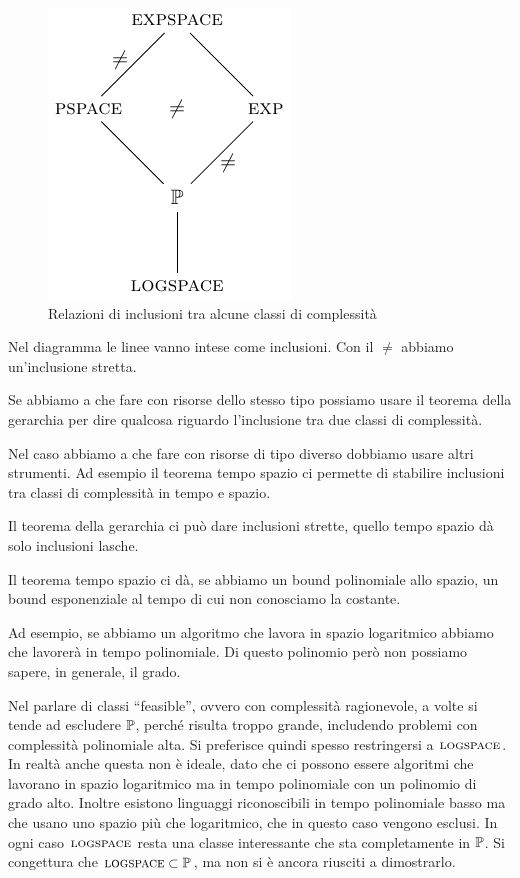 \begin{figure}[!h]
    \begin{center}
        \includegraphics{./img/timespacehierarchies/ComplexityDiagram.pdf}
        \caption{Relazioni di inclusioni tra alcune classi di complessità}
        \label{timespacehierarchies:img:detclassesrelations}
    \end{center}
\end{figure}

Nel diagramma le linee vanno intese come inclusioni. Con il $\not=$ abbiamo un'inclusione stretta.

Se abbiamo a che fare con risorse dello stesso tipo possiamo usare il teorema della gerarchia per
dire qualcosa riguardo l'inclusione tra due classi di complessità.

Nel caso abbiamo a che fare con risorse di tipo diverso dobbiamo usare altri strumenti. Ad esempio
il teorema tempo spazio ci permette di stabilire inclusioni tra classi di complessità in tempo e
spazio.

Il teorema della gerarchia ci può dare inclusioni strette, quello tempo spazio dà solo inclusioni
lasche.

Il teorema tempo spazio ci dà, se abbiamo un bound polinomiale allo spazio, un bound esponenziale al
tempo di cui non conosciamo la costante.

Ad esempio, se abbiamo un algoritmo che lavora in spazio logaritmico abbiamo che lavorerà in tempo
polinomiale. Di questo polinomio però non possiamo sapere, in generale, il grado.

Nel parlare di classi ``feasible'', ovvero con complessità ragionevole, a volte si tende ad
escludere $\mathbb{P}$, perché risulta troppo grande, includendo problemi con complessità polinomiale
alta. Si preferisce quindi spesso restringersi a $\textsc{logspace}$. In realtà anche questa non è ideale,
dato che ci possono essere algoritmi che lavorano in spazio logaritmico ma in tempo polinomiale con
un polinomio di grado alto. Inoltre esistono linguaggi riconoscibili in tempo polinomiale basso ma
che usano uno spazio più che logaritmico, che in questo caso vengono esclusi. In ogni caso
$\textsc{logspace}$ resta una classe interessante che sta completamente in $\mathbb{P}$. Si congettura che
$\textsc{logspace} \subset \mathbb{P}$, ma non si è ancora riusciti a dimostrarlo. 


